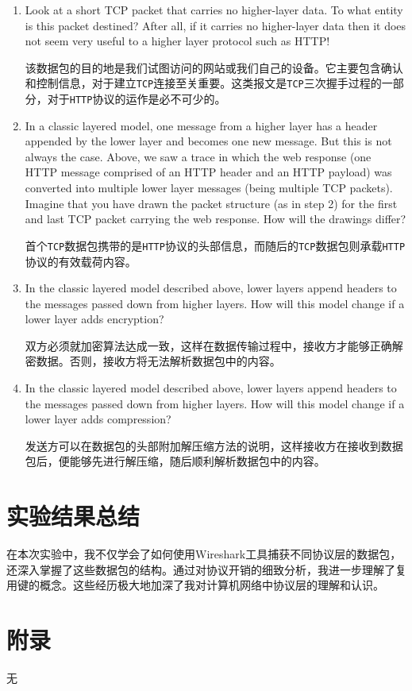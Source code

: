 \documentclass{article}
\begin{document}
	\begin{enumerate}[noitemsep]
		\item Look at a short TCP packet that carries no higher-layer data. To what entity is this packet destined? After all, if it carries no higher-layer data then it does not seem very useful to a higher layer protocol such as HTTP!
		
		该数据包的目的地是我们试图访问的网站或我们自己的设备。它主要包含确认和控制信息，对于建立\texttt{TCP}连接至关重要。这类报文是\texttt{TCP}三次握手过程的一部分，对于\texttt{HTTP}协议的运作是必不可少的。
		
		
		\item In a classic layered model, one message from a higher layer has a header appended by the lower layer and becomes one new message. But this is not always the case. Above, we saw a trace in which the web response (one HTTP message comprised of an HTTP header and an HTTP payload) was converted into multiple lower layer messages (being multiple TCP packets).  Imagine that you have drawn the packet structure (as in step 2) for the first and last TCP packet carrying the web response.  How will the drawings differ?
		
		首个\texttt{TCP}数据包携带的是\texttt{HTTP}协议的头部信息，而随后的\texttt{TCP}数据包则承载\texttt{HTTP}协议的有效载荷内容。
		
		\item In the classic layered model described above, lower layers append headers to the messages passed down from higher layers. How will this model change if a lower layer adds encryption?
		
		双方必须就加密算法达成一致，这样在数据传输过程中，接收方才能够正确解密数据。否则，接收方将无法解析数据包中的内容。
		
		\item In the classic layered model described above, lower layers append headers to the messages passed down from higher layers. How will this model change if a lower layer adds compression?
		
		发送方可以在数据包的头部附加解压缩方法的说明，这样接收方在接收到数据包后，便能够先进行解压缩，随后顺利解析数据包中的内容。
		
	\end{enumerate}
	
	\section{实验结果总结}
	
	在本次实验中，我不仅学会了如何使用Wireshark工具捕获不同协议层的数据包，还深入掌握了这些数据包的结构。通过对协议开销的细致分析，我进一步理解了复用键的概念。这些经历极大地加深了我对计算机网络中协议层的理解和认识。
	
	
	\section{附录}
	
	无
	
\end{document}
